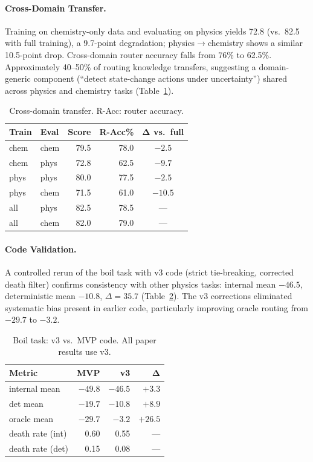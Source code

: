 \documentclass[11pt,a4paper]{article}
\begin{document}
\paragraph{Cross-Domain Transfer.} Training on chemistry-only data and evaluating on physics yields 72.8 (vs.\ 82.5 with full training), a 9.7-point degradation; physics$\to$chemistry shows a similar 10.5-point drop. Cross-domain router accuracy falls from 76\% to 62.5\%. Approximately 40--50\% of routing knowledge transfers, suggesting a domain-generic component (``detect state-change actions under uncertainty'') shared across physics and chemistry tasks (Table~\ref{tab:transfer}).

\begin{table}[t]
\centering
\small
\begin{tabular}{@{}llrrc@{}}
\toprule
\textbf{Train} & \textbf{Eval} & \textbf{Score} & \textbf{R-Acc\%} & $\boldsymbol{\Delta}$ \textbf{vs.\ full} \\
\midrule
chem & chem & 79.5 & 78.0 & $-2.5$ \\
chem & phys & 72.8 & 62.5 & $-9.7$ \\
phys & phys & 80.0 & 77.5 & $-2.5$ \\
phys & chem & 71.5 & 61.0 & $-10.5$ \\
all & phys & 82.5 & 78.5 & --- \\
all & chem & 82.0 & 79.0 & --- \\
\bottomrule
\end{tabular}
\caption{Cross-domain transfer. R-Acc: router accuracy.}
\label{tab:transfer}
\end{table}

\paragraph{Code Validation.} A controlled rerun of the boil task with v3 code (strict tie-breaking, corrected death filter) confirms consistency with other physics tasks: internal mean $-46.5$, deterministic mean $-10.8$, $\Delta{=}35.7$ (Table~\ref{tab:v3rerun}). The v3 corrections eliminated systematic bias present in earlier code, particularly improving oracle routing from $-29.7$ to $-3.2$.

\begin{table}[t]
\centering
\small
\begin{tabular}{@{}lrrr@{}}
\toprule
\textbf{Metric} & \textbf{MVP} & \textbf{v3} & $\boldsymbol{\Delta}$ \\
\midrule
internal mean & $-49.8$ & $-46.5$ & $+3.3$ \\
det mean & $-19.7$ & $-10.8$ & $+8.9$ \\
oracle mean & $-29.7$ & $-3.2$ & $+26.5$ \\
death rate (int) & 0.60 & 0.55 & --- \\
death rate (det) & 0.15 & 0.08 & --- \\
\bottomrule
\end{tabular}
\caption{Boil task: v3 vs.\ MVP code. All paper results use v3.}
\label{tab:v3rerun}
\end{table}
\end{document}
